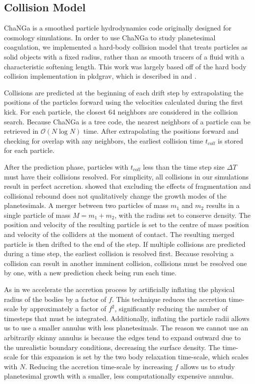 \documentclass [11pt, proquest] {uwthesis}[2020/02/24]
\begin{document}
\subsection{Collision Model} \label{sec:collModel}

{\sc ChaNGa} is a smoothed particle hydrodynamics code originally designed for cosmology simulations. In order to use 
{\sc ChaNGa} to study planetesimal coagulation, we implemented a hard-body collision model that treats particles as solid 
objects with a fixed radius, rather than as smooth tracers of a fluid with a characteristic softening length. This work was largely 
based off of the hard body collision implementation in {\sc pkdgrav}, which is described in \cite{richardson94} and 
\cite{richardson00}.

Collisions are predicted at the beginning of each drift step by extrapolating the positions of the particles forward using the 
velocities calculated during the first kick. For each particle, the closest 64 neighbors are considered in the collision search. 
Because {\sc ChaNGa} is a tree code, the nearest neighbors of a particle can be retrieved in $\mathcal{O}(N\log{}N)$ time. After 
extrapolating the positions forward and checking for overlap with any neighbors, the earliest collision time $t_{coll}$ is stored for 
each particle.

After the prediction phase, particles with $t_{coll}$ less than the time step size $\Delta T$ must have their collisions resolved. For 
simplicity, all collisions in our simulations result in perfect accretion. \cite{ida93} showed that excluding the effects of 
fragmentation and collisional rebound does not qualitatively change the growth modes of the planetesimals. A merger between 
two particles of mass $m_{1}$ and $m_{2}$ results in a single particle of mass $M = m_{1} + m_{2}$, with the radius set to 
conserve density. The position and velocity of the resulting particle is set to the centre of mass position and velocity of the 
colliders at the moment of contact. The resulting merged particle is then drifted to the end of the step. If multiple collisions are 
predicted during a time step, the earliest collision is resolved first. Because resolving a collision can result in another imminent 
collision, collisions must be resolved one by one, with a new prediction check being run each time.

As in \cite{kokubo96, kokubo98} we accelerate the accretion process by artificially inflating the physical radius of the bodies by 
a factor of $f$. This technique reduces the accretion time-scale by approximately a factor of $f^{2}$, significantly reducing the 
number of timesteps that must be integrated. Additionally, inflating the particle radii allows us to use a smaller annulus with less 
planetesimals. The reason we cannot use an arbitrarily skinny annulus is because the edges tend to expand outward due to the 
unrealistic boundary conditions, decreasing the surface density. The time-scale for this expansion is set by the two body 
relaxation time-scale, which scales with $N$. Reducing the accretion time-scale by increasing $f$ allows us to study 
planetesimal growth with a smaller, less computationally expensive annulus.
\end{document}
